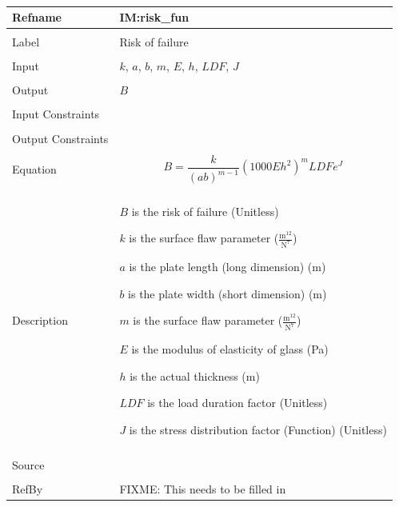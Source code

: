 \documentclass[12pt]{article}
\begin{document}
~\newline
\noindent \begin{minipage}{\textwidth}
\begin{tabular}{p{} p{}}
\toprule \textbf{Refname} & \textbf{IM:risk\_fun}
\label{IM:risk\_fun}
\\ \midrule \\
Label & Risk of failure
\\ \midrule \\
Input & $k$, $a$, $b$, $m$, $E$, $h$, $LDF$, $J$
\\ \midrule \\
Output & $B$
\\ \midrule \\
Input Constraints & 
\\ \midrule \\
Output Constraints & 
\\ \midrule \\
Equation & \begin{dmath}
           B=\frac{k}{\left(a b\right)^{m-1}} \left(1000 E h^{2}\right)^{m} LDF e^{J}
           \end{dmath}
\\ \midrule \\
Description & \begin{symbDescription}
              \item{$B$ is the risk of failure (Unitless)}
              \item{$k$ is the surface flaw parameter ($\frac{\text{m}^{12}}{\text{N}^{7}}$)}
              \item{$a$ is the plate length (long dimension) (m)}
              \item{$b$ is the plate width (short dimension) (m)}
              \item{$m$ is the surface flaw parameter ($\frac{\text{m}^{12}}{\text{N}^{7}}$)}
              \item{$E$ is the modulus of elasticity of glass (Pa)}
              \item{$h$ is the actual thickness (m)}
              \item{$LDF$ is the load duration factor (Unitless)}
              \item{$J$ is the stress distribution factor (Function) (Unitless)}
              \end{symbDescription}
\\ \midrule \\
Source & 
\\ \midrule \\
RefBy & FIXME: This needs to be filled in
\\ \bottomrule \end{tabular}
\end{minipage}\\
\end{document}
